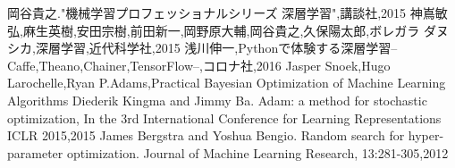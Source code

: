 

\begin{thebibliography}{99}
  岡谷貴之."機械学習プロフェッショナルシリーズ 深層学習",講談社,2015
  神嶌敏弘,麻生英樹,安田宗樹,前田新一,岡野原大輔,岡谷貴之,久保陽太郎,ボレガラ ダヌシカ,深層学習,近代科学社,2015
  浅川伸一,Pythonで体験する深層学習--Caffe,Theano,Chainer,TensorFlow--,コロナ社,2016
  Jasper Snoek,Hugo Larochelle,Ryan P.Adams,Practical Bayesian Optimization of Machine Learning Algorithms
  Diederik Kingma and Jimmy Ba. Adam: a method for stochastic optimization, In the 3rd International Conference for Learning Representations ICLR 2015,2015
   James Bergstra and Yoshua Bengio. Random search for hyper-parameter optimization. Journal of Machine Learning Research, 13:281-305,2012
  

\end{thebibliography}





